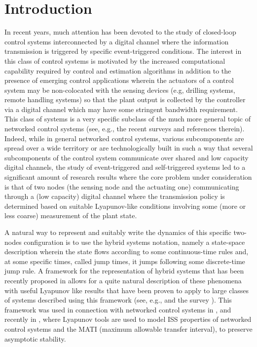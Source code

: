 \documentclass[twocolumn]{autart}
\begin{document}
\date{\today}

\maketitle




\section{Introduction}
\label{sec:introduction}

In recent years, much attention has been devoted to the study of
{ closed-loop control systems interconnected by a digital
  channel
where the information transmission is triggered by specific
event-triggered conditions.}
The interest in this class of control systems is motivated by 
the increased computational capability
required by control and estimation algorithms in addition to the presence
of emerging control applications 
{ wherein
the actuators of a control system may be non-colocated with the
sensing devices (e.g, drilling systems, remote handling systems) so
that the plant output is collected by the controller via a digital
channel which may have some stringent bandwidth requirement. 
This class of systems is a very specific subclass of the much more
general topic of networked control systems (see, e.g., the recent surveys
\cite{YangIEE06,HespanhaIEEE07} and references therein).
 Indeed, while
in general networked control systems, various subcomponents 
are spread over a wide territory or are technologically built in such
a way that several subcomponents of the control system communicate
over shared and low capacity digital channels,
the study of event-triggered and self-triggered systems
\cite{Anta10,Carnevale07,Cervin08,Mazo08,LpNCS,Tabuada07,Wang08a,Wang08b,Zhang01}
led to a significant amount of research results where the core problem
under consideration is that of two nodes (the sensing node and the
actuating one) communicating through
a (low capacity) digital channel where the transmission policy is
determined based on suitable Lyapunov-like conditions involving some
(more or less coarse) measurement of the plant state.}


{ A natural way to represent and suitably write the dynamics of 
this specific two-nodes configuration}
is to use the hybrid systems notation, namely a
state-space description wherein the state flows according to some
continuous-time rules and, at some specific times, called jump times,
it jumps following some discrete-time jump rule. A framework for the
representation of hybrid systems that has been recently proposed in
\cite{Goebel06,Goebel04} allows for a quite natural description of
these phenomena with useful Lyapunov like results that have been
proven to apply to large classes of systems described using this
framework (see, e.g., \cite{CaiTAC07,CaiTAC08} and the survey
\cite{GoebelCSM09}).
This framework was used in connection with networked control systems
in \cite{Carnevale07,LpNCS}, and recently in \cite{Postoyan11a,Postoyan11b},
where Lyapunov tools are used to 
model ISS properties of networked control systems and the 
MATI (maximum allowable transfer interval), to preserve asymptotic stability.
\end{document}
